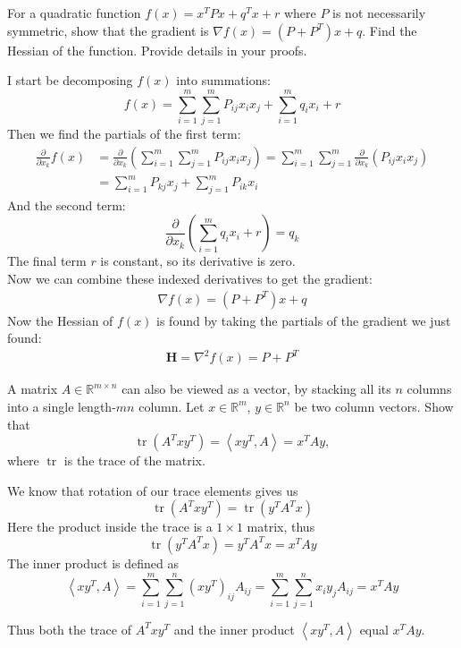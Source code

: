 \documentclass[11pt]{article}
\DeclareMathOperator{\tr}{tr}
\begin{document}
\begin{homeworkProblem}

For a quadratic function $f(x) = x^T P x + q^T x + r$ where $P$ is not necessarily symmetric, show that the gradient 
is $\nabla f(x) = (P + P^T) x + q$. Find the Hessian of the function. Provide details in your proofs. \vspace{1\baselineskip}

\solution

I start be decomposing $f(x)$ into summations:
\[
    f(x) = \sum_{i=1}^m \sum_{j=1}^m P_{ij} x_i x_j + \sum_{i=1}^m q_i x_i + r
\]
Then we find the partials of the first term:
\begin{align*}
    \frac{\partial}{\partial x_k} f(x) &= \frac{\partial}{\partial x_k} \left( \sum_{i=1}^m \sum_{j=1}^m P_{ij} x_i x_j \right) 
    = \sum_{i=1}^m \sum_{j=1}^m \frac{\partial}{\partial x_k} (P_{ij} x_i x_j) \\
    &= \sum_{i=1}^m P_{kj} x_j + \sum_{j=1}^m P_{ik} x_i
\end{align*}
And the second term:
\[
    \frac{\partial}{\partial x_k} \left( \sum_{i=1}^m q_i x_i + r \right) = q_k
\]
The final term $r$ is constant, so its derivative is zero. \\

Now we can combine these indexed derivatives to get the gradient:
\begin{align*}
    \nabla f(x) = (P + P^T)x + q
\end{align*}
Now the Hessian of $f(x)$ is found by taking the partials of the gradient we just found:
\begin{align*}
    \mathbf{H} = \nabla^2 f(x) = P + P^T
\end{align*}
\end{homeworkProblem}

\pagebreak

\begin{homeworkProblem}

A matrix $A \in \mathbb{R}^{m \times n}$ can also be viewed as a vector, by stacking all its $n$ columns into a single 
length-$mn$ column. Let $x \in \mathbb{R}^m$, $y \in \mathbb{R}^n$ be two column vectors. Show that
\[
    \tr(A^T xy^T) = \left<xy^T, A\right> = x^T Ay,
\] 
where $\tr$ is the trace of the matrix. \vspace{1\baselineskip}

\solution

We know that rotation of our trace elements gives us 
\[
    \tr(A^T x y^T) = \tr(y^T A^T x)
\]
Here the product inside the trace is a $1 \times 1$ matrix, thus 
\[
    \tr(y^T A^T x) = y^T A^T x = x^T A y
\]
The inner product is defined as
\[
    \left<xy^T, A\right> = \sum_{i=1}^{m}\sum_{j=1}^{n} (xy^T)_{ij} A_{ij} = \sum_{i=1}^{m}\sum_{j=1}^{n} x_i y_j A_{ij} = x^T A y
\]
\end{homeworkProblem}
Thus both the trace of $A^T xy^T$ and the inner product $\left<xy^T, A\right>$ equal $x^T A y$.
\pagebreak
\end{document}
